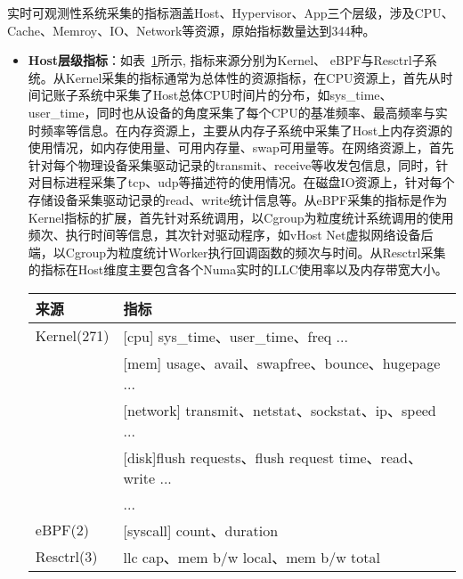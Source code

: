 
实时可观测性系统采集的指标涵盖Host、Hypervisor、App三个层级，涉及CPU、Cache、Memroy、IO、Network等资源，原始指标数量达到344种。

\begin{itemize}
    \item \textbf{Host层级指标}：如表~\ref{tab:host_metric}所示, 指标来源分别为Kernel、
eBPF与Resctrl子系统。从Kernel采集的指标通常为总体性的资源指标，在CPU资源上，首先从时间记账子系统中采集了Host总体CPU时间片的分布，如sys\_time、user\_time，同时也从设备的角度采集了每个CPU的基准频率、最高频率与实时频率等信息。在内存资源上，主要从内存子系统中采集了Host上内存资源的使用情况，如内存使用量、可用内存量、swap可用量等。在网络资源上，首先针对每个物理设备采集驱动记录的transmit、receive等收发包信息，同时，针对目标进程采集了tcp、udp等描述符的使用情况。在磁盘IO资源上，针对每个存储设备采集驱动记录的read、write统计信息等。从eBPF采集的指标是作为Kernel指标的扩展，首先针对系统调用，以Cgroup为粒度统计系统调用的使用频次、执行时间等信息，其次针对驱动程序，如vHost Net虚拟网络设备后端，以Cgroup为粒度统计Worker执行回调函数的频次与时间。从Resctrl采集的指标在Host维度主要包含各个Numa实时的LLC使用率以及内存带宽大小。

\begin{table}[!htbp]
    \label{tab:host_metric}
    \footnotesize%
    \setlength{\tabcolsep}{4pt}%
    \renewcommand{\arraystretch}{1.25}%
    \centering
    \begin{tabular}{ll}
        \hline
        来源 & 指标\\
        \hline
        Kernel(271) & [cpu] sys\_time、user\_time、freq ... \\
        & [mem] usage、avail、swapfree、bounce、hugepage ...\\
        & [network] transmit、netstat、sockstat、ip、speed ...\\
        & [disk]flush requests、flush request time、read、write ...\\
        & ...\\
        eBPF(2) & [syscall] count、duration\\
        Resctrl(3) & llc cap、mem b/w local、mem b/w total\\
        \hline
    \end{tabular}
\end{table}


\end{itemize}
